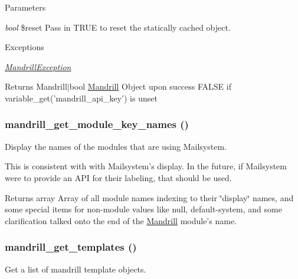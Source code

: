 \begin{DoxyParams}{Parameters}
\item[{\em bool}]\$reset Pass in TRUE to reset the statically cached object.\end{DoxyParams}

\begin{DoxyExceptions}{Exceptions}
\item[{\em \hyperlink{classMandrillException}{MandrillException}}]\end{DoxyExceptions}
\begin{DoxyReturn}{Returns}
Mandrill$|$bool \hyperlink{classMandrill}{Mandrill} Object upon success FALSE if variable\_\-get('mandrill\_\-api\_\-key') is unset 
\end{DoxyReturn}
\hypertarget{mandrill_8module_a7d8c1a5b8a942d9ba32a286c0d8c337d}{
\subsubsection[{mandrill\_\-get\_\-module\_\-key\_\-names}]{\setlength{\rightskip}{0pt plus 5cm}mandrill\_\-get\_\-module\_\-key\_\-names ()}}
\label{mandrill_8module_a7d8c1a5b8a942d9ba32a286c0d8c337d}
Display the names of the modules that are using Mailsystem.

This is consistent with with Mailsystem's display. In the future, if Mailsystem were to provide an API for their labeling, that should be used.

\begin{DoxyReturn}{Returns}
array Array of all module names indexing to their \char`\"{}display\char`\"{} names, and some special items for non-\/module values like null, default-\/system, and some clarification talked onto the end of the \hyperlink{classMandrill}{Mandrill} module's name. 
\end{DoxyReturn}
\hypertarget{mandrill_8module_a853d6bb3d5652daffe6a14a86c76bac6}{
\subsubsection[{mandrill\_\-get\_\-templates}]{\setlength{\rightskip}{0pt plus 5cm}mandrill\_\-get\_\-templates ()}}
\label{mandrill_8module_a853d6bb3d5652daffe6a14a86c76bac6}
Get a list of mandrill template objects.


